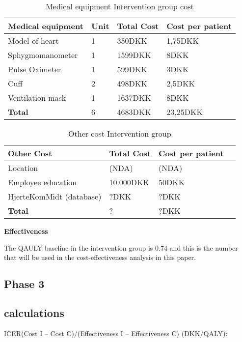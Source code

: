 \begin{table}[H]
\begin{longtabu} to 
    \textbf{Medical equipment} & \textbf{Unit} &\textbf{Total Cost} & \textbf{Cost per patient} \\[-1ex]
    \midrule
    Model of heart   &  1 &  350DKK & 1,75DKK \\ \hline
    Sphygmomanometer  & 1 & 1599DKK & 8DKK  \\ \hline
    Pulse Oximeter    &  1 & 599DKK &   3DKK \\ \hline 
    Cuff    &  2 & 498DKK  &   2,5DKK  \\ \hline 
    Ventilation mask   &  1 & 1637DKK  &   8DKK \\
    \hline \hline \hline
    \textbf{Total} & 6 & 4683DKK & 23,25DKK
    \newline
    \newline
   \end{longtabu}
\caption{Medical equipment Intervention group cost}
\label{tab: MeI}
\end{table}

\begin{table}[H]
\begin{longtabu} to 
    \textbf{Other Cost} &\textbf{Total Cost} & \textbf{Cost per patient} \\[-1ex]
    \midrule
    Location   &  (NDA) & (NDA) \\ \hline
    Employee education   & 10.000DKK & 50DKK  \\ \hline
    HjerteKomMidt (database)  & ?DKK &   ?DKK \\
    \hline \hline \hline
    \textbf{Total} & ?  & ?DKK
    \newline
    \newline
   \end{longtabu}
\caption{Other cost Intervention group}
\label{tab: OI}
\end{table}

\textbf{Effectiveness}

The QAULY baseline in the intervention group is 0.74 and this is the number that will be used in the cost-effectiveness analysis in this paper\cite{costeffect}. 

\subsection{Phase 3}


\subsection{calculations}

ICER(Cost I – Cost C)/(Effectiveness I – Effectiveness C) (DKK/QALY):















